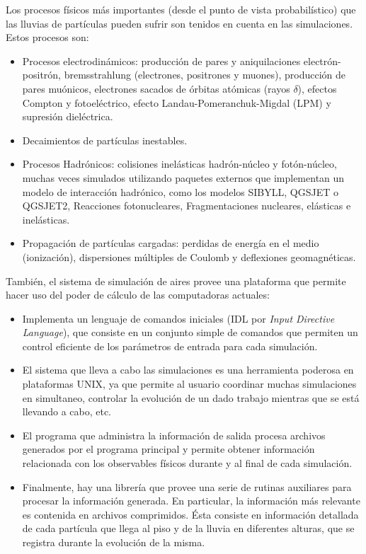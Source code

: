 	Los procesos físicos m\'as importantes (desde el punto de vista probabilístico) que las lluvias de part\'iculas pueden sufrir son tenidos en cuenta en las simulaciones. 
	Estos procesos son:

	\begin{itemize}
	\item Procesos electrodin\'amicos: producci\'on de pares y aniquilaciones electr\'on-positr\'on, bremsstrahlung (electrones, positrones y muones), producci\'on de pares mu\'onicos, electrones sacados de \'orbitas at\'omicas (rayos $\delta$), efectos Compton y fotoel\'ectrico, efecto Landau-Pomeranchuk-Migdal (LPM) y supresi\'on diel\'ectrica.
	\item Decaimientos de part\'iculas inestables.
	\item Procesos Hadr\'onicos: colisiones inel\'asticas hadr\'on-n\'ucleo y fot\'on-n\'ucleo, muchas veces simulados utilizando paquetes externos que implementan un modelo de interacci\'on hadr\'onico, como los modelos SIBYLL, QGSJET o QGSJET2, Reacciones fotonucleares, Fragmentaciones nucleares, elásticas e inelásticas.
	\item Propagaci\'on de part\'iculas cargadas: perdidas de energ\'ia en el medio (ionizaci\'on), dispersiones múltiples de Coulomb y deflexiones geomagn\'eticas.
	\end{itemize}    

	Tambi\'en, el sistema de simulación de {\sc aires} provee una plataforma que permite hacer uso del poder de c\'alculo de las computadoras actuales:
	
	\begin{itemize}
	\item Implementa un lenguaje de comandos iniciales (IDL por {\em Input Directive Language}), que consiste en un conjunto simple de comandos que permiten un control eficiente de los par\'ametros de entrada para cada simulación. 
	\item El sistema que lleva a cabo las simulaciones es una herramienta poderosa en plataformas UNIX, ya que permite al usuario coordinar muchas simulaciones en simultaneo, controlar la evolución de un dado trabajo mientras que se está llevando a cabo, etc.
	\item El programa que administra la información de salida procesa archivos generados por el programa principal y permite obtener información relacionada con los observables físicos durante y al final de cada simulación.
	\item Finalmente, hay una librería que provee una serie de rutinas auxiliares para procesar la información generada. En particular, la información m\'as relevante es contenida en archivos comprimidos. \'Esta consiste en informaci\'on detallada de cada part\'icula que llega al piso y de la lluvia en diferentes alturas, que se registra durante la evolución de la misma.
	\end{itemize}
	
